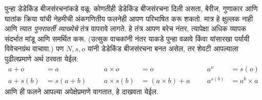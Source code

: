 \documentclass[../../../include/open-logic-section]{subfiles}
\begin{document}
पुन्हा डेडेकिंड बीजसंरचनांकडे वळू: कोणतीही डेडेकिंड बीजसंरचना दिली
असता, बेरीज, गुणाकार आणि घातांक क्रिया यांची नेहमीची अंकगणितीय फलनेही
आपण परिभाषित करू शकतो. मात्र हे क्षुल्लक नाही आणि त्यात
\emph{पुनरावर्ती व्याख्येचे} तंत्र वापरावे लागते. हे तंत्र आपण बरेच नंतर,
त्यापेक्षा अधिक व्यापक संदर्भात मांडू आणि समर्थित करू.
(उत्सुक वाचकांनी  नंतर याकडे पुन्हा
वळावे किंवा \citealt[pp.~95--8]{Potter2004} यांसारखा पर्यायी विवेचनग्रंथ
वाचावा.) पण $N, s, o$ यांनी डेडेकिंड बीजसंरचना बनत असेल, तर शेवटी
आपल्याला पुढीलप्रमाणे अर्थ ठरवता येईल:
\begin{align*}
	{a} + {o} &= {a} & & & {a} \times {o} &= {o} & & & {a}^{o} &= s(o)\\
{a} + {s}({b}) &= {s}({a}+{b}) &&& {a} \times {s}({b}) &= ({a}\times {b}) + {a}  & & & {a}^{{s}({b})} &= {a}^{b} \times {a}
\end{align*}
आणि ही फलने आपल्या अपेक्षेप्रमाणे वागतात, हे दाखवता येईल.
\end{document}
